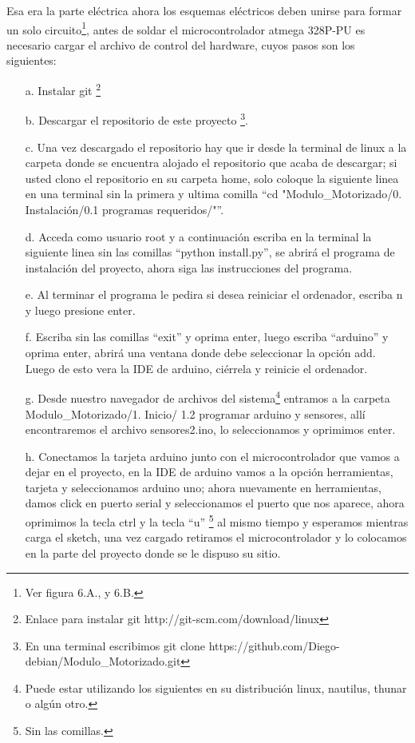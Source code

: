 \documentclass[12]{article}
\begin{document}
\begin{multicols}{2}
Esa era la parte eléctrica ahora los esquemas eléctricos deben unirse para formar un solo circuito\footnote{Ver figura 6.A., y 6.B.}, antes de soldar el microcontrolador atmega 328P-PU es necesario cargar el archivo de control del hardware, cuyos pasos son los siguientes:
\begin{enumerate}
\item[a.] Instalar git \footnote{Enlace para instalar git  http://git-scm.com/download/linux }
\item[b.] Descargar el repositorio de este proyecto \footnote{En una terminal escribimos git  clone https://github.com/Diego-debian/Modulo\_Motorizado.git}.
\item[c.] Una vez descargado el repositorio hay que ir desde la terminal de linux a la carpeta donde se encuentra alojado el repositorio que acaba de descargar; si usted clono el repositorio en su carpeta home, solo coloque la siguiente linea en una terminal  sin la primera y ultima comilla “cd "Modulo\_Motorizado/0. Instalación/0.1 programas requeridos/"”.
\item[d.] Acceda como usuario root y a continuación escriba en la terminal la siguiente linea sin las comillas “python install.py”, se abrirá el programa de instalación del proyecto, ahora siga las instrucciones del programa.
\item[e.] Al terminar el programa le pedira si desea reiniciar el ordenador, escriba n y luego presione enter.
\item[f.] Escriba sin las comillas “exit” y oprima enter, luego escriba “arduino” y oprima enter, abrirá una ventana donde debe seleccionar la opción add. Luego de esto vera la IDE de arduino, ciérrela y reinicie el ordenador.
\item[g.] Desde nuestro navegador de archivos del sistema\footnote{Puede estar utilizando los siguientes en su distribución linux, nautilus, thunar o algún otro.}  entramos a la carpeta Modulo\_Motorizado/1. Inicio/ 1.2 programar arduino y sensores, allí encontraremos el archivo sensores2.ino, lo seleccionamos y oprimimos enter.
\item[h.] Conectamos la tarjeta arduino junto con el microcontrolador que vamos a dejar en el proyecto, en la IDE de arduino vamos a la opción herramientas,  tarjeta y seleccionamos arduino uno;  ahora nuevamente en herramientas, damos click en puerto serial y seleccionamos el puerto que nos aparece,  ahora oprimimos la tecla ctrl y la tecla “u” \footnote{Sin las comillas.} al mismo tiempo y esperamos mientras carga el sketch, una vez cargado retiramos el microcontrolador y lo colocamos en la parte del proyecto donde se le dispuso su sitio.   
\end{enumerate}


\end{multicols}
\end{document}
